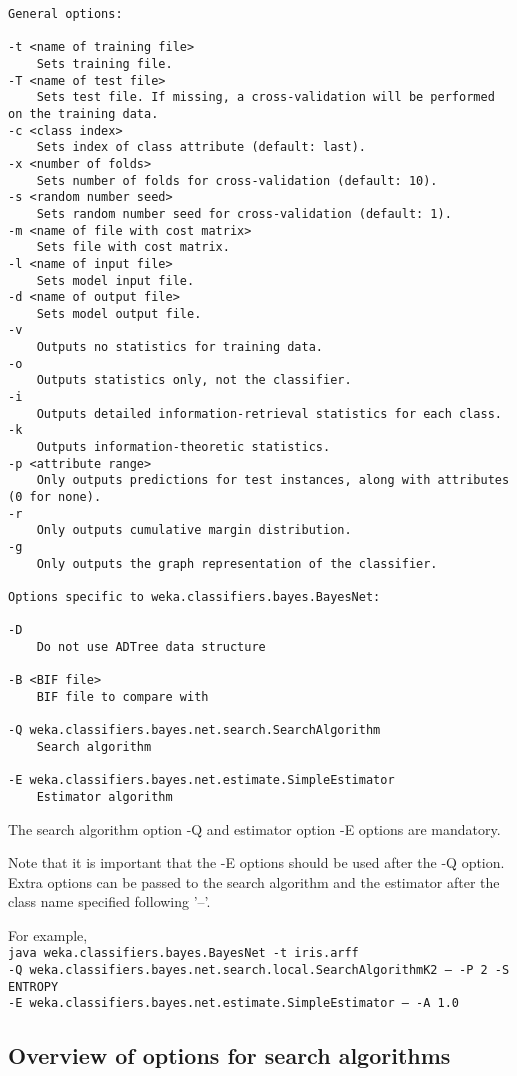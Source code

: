 \documentclass{article}
\begin{document}
{\small
\begin{verbatim}
General options:

-t <name of training file>
	Sets training file.
-T <name of test file>
	Sets test file. If missing, a cross-validation will be performed on the training data.
-c <class index>
	Sets index of class attribute (default: last).
-x <number of folds>
	Sets number of folds for cross-validation (default: 10).
-s <random number seed>
	Sets random number seed for cross-validation (default: 1).
-m <name of file with cost matrix>
	Sets file with cost matrix.
-l <name of input file>
	Sets model input file.
-d <name of output file>
	Sets model output file.
-v
	Outputs no statistics for training data.
-o
	Outputs statistics only, not the classifier.
-i
	Outputs detailed information-retrieval statistics for each class.
-k
	Outputs information-theoretic statistics.
-p <attribute range>
	Only outputs predictions for test instances, along with attributes (0 for none).
-r
	Only outputs cumulative margin distribution.
-g
	Only outputs the graph representation of the classifier.

Options specific to weka.classifiers.bayes.BayesNet:

-D
	Do not use ADTree data structure

-B <BIF file>
	BIF file to compare with

-Q weka.classifiers.bayes.net.search.SearchAlgorithm
	Search algorithm

-E weka.classifiers.bayes.net.estimate.SimpleEstimator
	Estimator algorithm

\end{verbatim}
}

The search algorithm option -Q and estimator option -E options are mandatory.

Note that it is important that the -E options should be used after the
-Q option. Extra options can be passed to the search algorithm and
the estimator after the class name specified following '--'.

For example,\\
{\tt java weka.classifiers.bayes.BayesNet -t iris.arff \\
 -Q weka.classifiers.bayes.net.search.local.SearchAlgorithmK2 -- -P 2 -S ENTROPY\\
 -E weka.classifiers.bayes.net.estimate.SimpleEstimator -- -A 1.0}

\subsection*{Overview of options for search algorithms}
\end{document}
